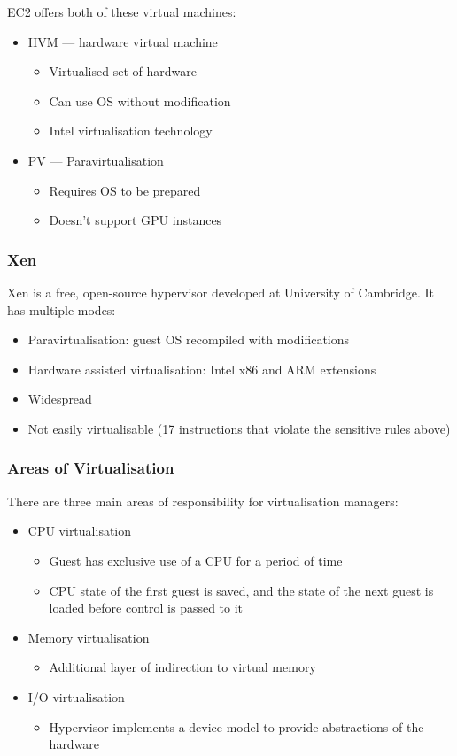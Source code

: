 \documentclass[11pt,a4paper,titlepage,dvipsnames,cmyk]{scrartcl}
\begin{document}
EC2 offers both of these virtual machines:
\begin{itemize}
    \item HVM --- hardware virtual machine
    \begin{itemize}
        \item Virtualised set of hardware
        \item Can use OS without modification
        \item Intel virtualisation technology
    \end{itemize}
    \item PV --- Paravirtualisation
    \begin{itemize}
        \item Requires OS to be prepared
        \item Doesn't support GPU instances
    \end{itemize}
\end{itemize}

\subsubsection{Xen}
Xen is a free, open-source hypervisor developed at University of Cambridge. It has multiple modes:
\begin{itemize}
    \item Paravirtualisation: guest OS recompiled with modifications
    \item Hardware assisted virtualisation: Intel x86 and ARM extensions
    \item Widespread
    \item Not easily virtualisable (17 instructions that violate the sensitive rules above)
\end{itemize}

\subsubsection{Areas of Virtualisation}
There are three main areas of responsibility for virtualisation managers:
\begin{itemize}
    \item CPU virtualisation
    \begin{itemize}
        \item Guest has exclusive use of a CPU for a period of time
        \item CPU state of the first guest is saved, and the state of the next guest is loaded before control is passed to it
    \end{itemize}
    \item Memory virtualisation
    \begin{itemize}
        \item Additional layer of indirection to virtual memory
    \end{itemize}
    \item I/O virtualisation
    \begin{itemize}
        \item Hypervisor implements a device model to provide abstractions of the hardware
    \end{itemize}
\end{itemize}
\end{document}

